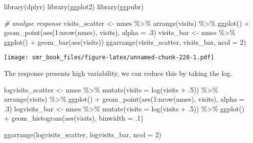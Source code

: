 \documentclass[
  oneside]{book}
\newenvironment{Shaded}{\begin{snugshade}}{\end{snugshade}}
\newcommand{\AttributeTok}[1]{\textcolor[rgb]{0.77,0.63,0.00}{#1}}
\newcommand{\CommentTok}[1]{\textcolor[rgb]{0.56,0.35,0.01}{\textit{#1}}}
\newcommand{\DecValTok}[1]{\textcolor[rgb]{0.00,0.00,0.81}{#1}}
\newcommand{\FunctionTok}[1]{\textcolor[rgb]{0.00,0.00,0.00}{#1}}
\newcommand{\NormalTok}[1]{#1}
\newcommand{\OtherTok}[1]{\textcolor[rgb]{0.56,0.35,0.01}{#1}}
\newcommand{\SpecialCharTok}[1]{\textcolor[rgb]{0.00,0.00,0.00}{#1}}
\begin{document}
\begin{Shaded}
\begin{Highlighting}[]
\FunctionTok{library}\NormalTok{(dplyr)}
\FunctionTok{library}\NormalTok{(ggplot2)}
\FunctionTok{library}\NormalTok{(ggpubr)}

\CommentTok{\# analyse response}
\NormalTok{visits\_scatter }\OtherTok{\textless{}{-}}\NormalTok{ nmes }\SpecialCharTok{\%\textgreater{}\%}
  \FunctionTok{arrange}\NormalTok{(visits) }\SpecialCharTok{\%\textgreater{}\%}
  \FunctionTok{ggplot}\NormalTok{() }\SpecialCharTok{+}
  \FunctionTok{geom\_point}\NormalTok{(}\FunctionTok{aes}\NormalTok{(}\DecValTok{1}\SpecialCharTok{:}\FunctionTok{nrow}\NormalTok{(nmes), visits), }\AttributeTok{alpha =}\NormalTok{ .}\DecValTok{3}\NormalTok{)}
\NormalTok{visits\_bar }\OtherTok{\textless{}{-}}\NormalTok{ nmes }\SpecialCharTok{\%\textgreater{}\%}
  \FunctionTok{ggplot}\NormalTok{() }\SpecialCharTok{+}
  \FunctionTok{geom\_bar}\NormalTok{(}\FunctionTok{aes}\NormalTok{(visits))}
\FunctionTok{ggarrange}\NormalTok{(visits\_scatter, visits\_bar, }\AttributeTok{ncol =} \DecValTok{2}\NormalTok{)}
\end{Highlighting}
\end{Shaded}

\texttt{[image: smr\_book\_files/figure-latex/unnamed-chunk-220-1.pdf]}

The response presents high variability, we can reduce this by taking the log.

\begin{Shaded}
\begin{Highlighting}[]
\NormalTok{logvisits\_scatter }\OtherTok{\textless{}{-}}\NormalTok{ nmes }\SpecialCharTok{\%\textgreater{}\%}
  \FunctionTok{mutate}\NormalTok{(}\AttributeTok{visits =} \FunctionTok{log}\NormalTok{(visits }\SpecialCharTok{+}\NormalTok{ .}\DecValTok{5}\NormalTok{)) }\SpecialCharTok{\%\textgreater{}\%}
  \FunctionTok{arrange}\NormalTok{(visits) }\SpecialCharTok{\%\textgreater{}\%}
  \FunctionTok{ggplot}\NormalTok{() }\SpecialCharTok{+}
  \FunctionTok{geom\_point}\NormalTok{(}\FunctionTok{aes}\NormalTok{(}\DecValTok{1}\SpecialCharTok{:}\FunctionTok{nrow}\NormalTok{(nmes), visits), }\AttributeTok{alpha =}\NormalTok{ .}\DecValTok{3}\NormalTok{)}
\NormalTok{logvisits\_bar }\OtherTok{\textless{}{-}}\NormalTok{ nmes }\SpecialCharTok{\%\textgreater{}\%}
  \FunctionTok{mutate}\NormalTok{(}\AttributeTok{visits =} \FunctionTok{log}\NormalTok{(visits }\SpecialCharTok{+}\NormalTok{ .}\DecValTok{5}\NormalTok{)) }\SpecialCharTok{\%\textgreater{}\%}
  \FunctionTok{ggplot}\NormalTok{() }\SpecialCharTok{+}
  \FunctionTok{geom\_histogram}\NormalTok{(}\FunctionTok{aes}\NormalTok{(visits), }\AttributeTok{binwidth =}\NormalTok{ .}\DecValTok{1}\NormalTok{)}

\FunctionTok{ggarrange}\NormalTok{(logvisits\_scatter, logvisits\_bar, }\AttributeTok{ncol =} \DecValTok{2}\NormalTok{)}
\end{Highlighting}
\end{Shaded}
\end{document}
